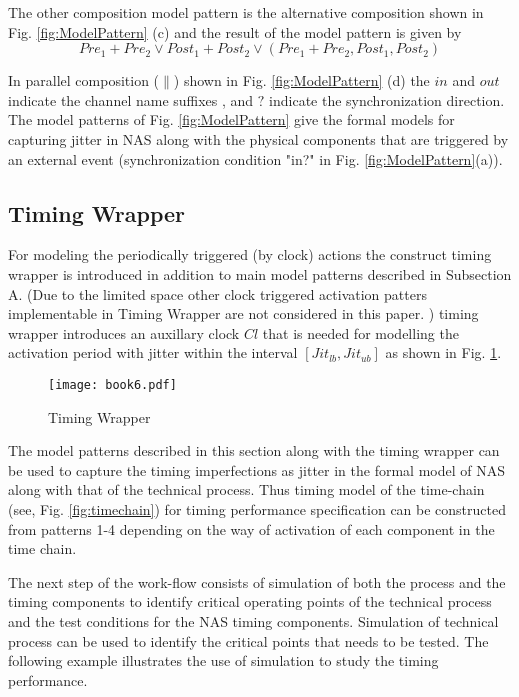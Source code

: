 \documentclass[letterpaper, 10 pt, conference]{ieeeconf}
\begin{document}
The other composition model pattern is the alternative composition shown in Fig. \ref{fig:ModelPattern} (c) and the result of the model pattern is given by
\begin{equation}
Pre_1+Pre_2  \vee Post_1+Post_2  \vee (Pre_1+Pre_2,Post_1,Post_2)
\label{eq:AltComp}
\end{equation}

In parallel composition ($\parallel$) shown in Fig. \ref{fig:ModelPattern} (d) the $in$ and $out$ indicate the channel name suffixes $\!$, and $?$ indicate the  synchronization direction.  The model patterns of Fig. \ref{fig:ModelPattern} give the formal models for capturing jitter in NAS along with the physical components that are triggered by an external event (synchronization condition "in?" in Fig.  \ref{fig:ModelPattern}(a)).


\subsection{Timing Wrapper}
For modeling the periodically triggered (by clock) actions the construct timing wrapper is introduced in addition to main model patterns described in Subsection A.  (Due to the  limited space other clock triggered activation patters  implementable in Timing Wrapper are not considered in this paper. ) timing wrapper introduces an auxillary clock $Cl$ that is needed for modelling the activation period with jitter within the interval $[Jit_{lb},Jit_{ub}]$ as shown in Fig. \ref{fig:TimeWrap}.

\begin{figure}[h]
\centering
\texttt{[image: book6.pdf]}
\caption{Timing Wrapper}
\label{fig:TimeWrap}
\end{figure}

The model patterns described in this section along with the timing wrapper can be used to capture the timing imperfections as jitter in the formal model of NAS along with that of the technical process. Thus timing model of the time-chain (see, Fig. \ref{fig:timechain}) for timing performance specification can be constructed from patterns 1-4 depending on the way of activation of each component in the time chain. 

The next step of the work-flow consists of simulation of both the process and the timing components to identify critical operating points of the technical process and the test conditions for the NAS timing components. Simulation of technical process can be used to identify the critical points that needs to be tested. The following example illustrates the use of simulation to study the timing performance.
\end{document}
